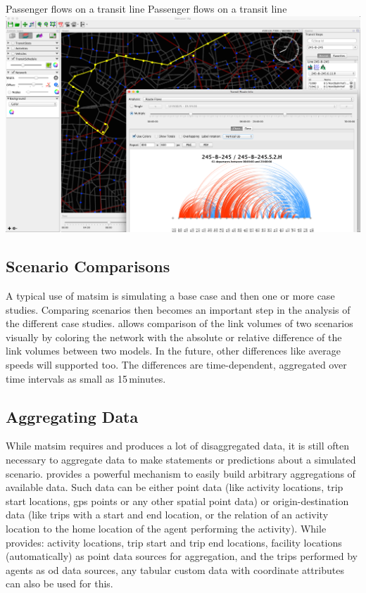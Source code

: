 \createfigure%
{Passenger flows on a transit line}%
{Passenger flows on a transit line}%
{\label{fig:via:ptrouteflow}}%
{\includegraphics[width=1.\textwidth,angle=0]{./extending/figures/via/ptrouteflows}}%
{}

\subsection{Scenario Comparisons}
A typical use of \gls{matsim} is simulating a base case and then one or more
case studies. Comparing scenarios then becomes an important step in the analysis
of the different case studies. \Via{} allows comparison of the link volumes of two
scenarios visually by coloring the network with the absolute or relative
difference of the link volumes between two models. In the future, other
differences like average speeds will supported too. The differences are
time-dependent, aggregated over time intervals as small as 15\,minutes.

\subsection{Aggregating Data}
While \gls{matsim} requires and produces a lot of disaggregated data, it 
is still often necessary to aggregate data to make statements or predictions about a
simulated scenario. \Via{} provides a powerful mechanism to easily build
arbitrary aggregations of available data. Such data can be either point data
(like activity locations, trip start locations, \gls{gps} points or any other spatial
point data) or origin-destination data (like trips with a start and end
location, or the relation of an activity location to the home location of the
agent performing the activity). While \Via{} provides: activity locations, trip
start and trip end locations, facility locations (automatically) as point data
sources for aggregation, and the trips performed by agents as \gls{od} data sources,
any tabular custom data with coordinate attributes can also be used for this. 

